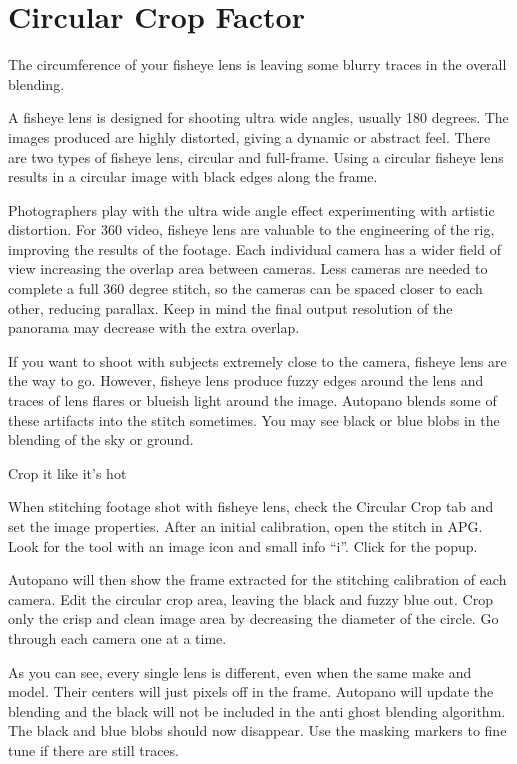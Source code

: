\chapter{Circular Crop Factor}
\pagecolor{white}
\label{chap:43}
\begin{fullwidth}

\problem

{\large The circumference of your fisheye lens is leaving some blurry traces in the overall blending. \par}

A fisheye lens is designed for shooting ultra wide angles, usually 180 degrees. The images produced are highly distorted, giving a dynamic or abstract feel. There are two types of fisheye lens, circular and full-frame. Using a circular fisheye lens results in a circular image with black edges along the frame.


Photographers play with the ultra wide angle effect experimenting with artistic distortion. For 360 video, fisheye lens are valuable to the engineering of the rig, improving the results of the footage. Each individual camera has a wider field of view increasing the overlap area between cameras. Less cameras are needed to complete a full 360 degree stitch, so the cameras can be spaced closer to each other, reducing parallax. Keep in mind the final output resolution of the panorama may decrease with the extra overlap. 
\clearpage


If you want to shoot with subjects extremely close to the camera, fisheye lens are the way to go. However, fisheye lens produce fuzzy edges around the lens and traces of lens flares or blueish light around the image. Autopano blends some of these artifacts into the stitch sometimes. You may see black or blue blobs in the blending of the sky or ground.

\solution

{\large Crop it like it’s hot \par}

When stitching footage shot with fisheye lens, check the Circular Crop tab and set the image properties. After an initial calibration, open the stitch in APG. Look for the tool with an image icon and small info “i”. Click for the popup.

\clearpage
Autopano will then show the frame extracted for the stitching calibration of each camera. Edit the circular crop area, leaving the black and fuzzy blue out. Crop only the crisp and clean image area by decreasing the diameter of the circle. Go through each camera one at a time. 


As you can see, every single lens is different, even when the same make and model. Their centers will just pixels off in the frame. Autopano will update the blending and the black will not be included in the anti ghost blending algorithm. The black and blue blobs should now disappear. Use the masking markers to fine tune if there are still traces.

\clearpage
\end{fullwidth}